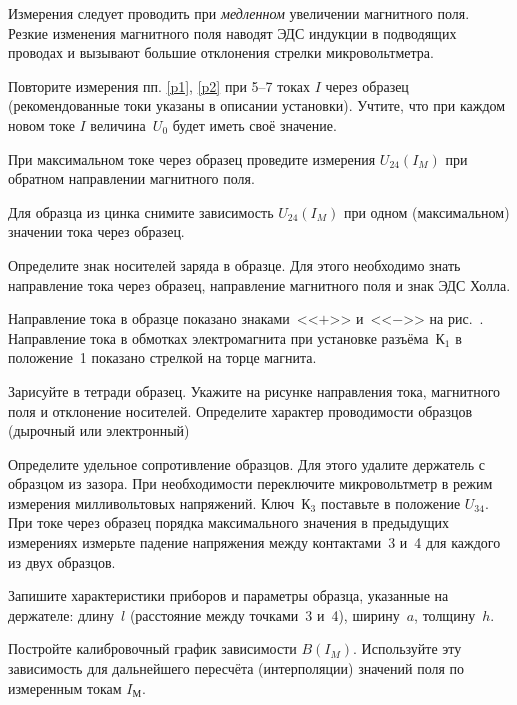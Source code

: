 \begin{lab:task}
Измерения следует проводить при \emph{медленном} увеличении магнитного поля. 
Резкие изменения магнитного поля наводят ЭДС индукции в подводящих проводах 
и вызывают большие отклонения стрелки микровольтметра.

\item Повторите измерения пп. \ref{p1}, \ref{p2} при 5--7 токах $I$ через образец
(рекомендованные токи указаны в описании установки).  
Учтите, что при каждом новом токе $I$ величина~$U_0$ будет иметь 
своё значение.

\item При максимальном токе через образец проведите измерения $U_{24}(I_{M})$ 
при обратном направлении магнитного поля.

\item Для образца из цинка снимите зависимость $U_{24}(I_{M})$ при одном 
(максимальном) значении тока через образец.

\item Определите знак носителей заряда в образце. Для этого необходимо знать
направление тока через образец, направление магнитного поля и знак ЭДС Холла.

Направление тока в образце показано знаками~<<$+$>> и~<<$-$>> на
рис.~. Направление тока в обмотках электромагнита при 
установке разъёма~К$_1$ в положение~1 показано стрелкой на торце магнита.

Зарисуйте в тетради образец. Укажите на рисунке направления тока, магнитного
поля и отклонение носителей. Определите характер проводимости образцов
(дырочный или электронный)

\item Определите удельное сопротивление образцов. Для этого удалите держатель с
образцом из зазора. При необходимости переключите микровольтметр 
в режим измерения милливольтовых напряжений. Ключ~К$_3$ поставьте 
в положение $U_{34}$. При токе через образец порядка максимального 
значения в предыдущих измерениях измерьте падение напряжения между 
контактами~3 и~4 для каждого из двух образцов.

\item Запишите характеристики приборов и параметры образца, указанные на держателе:
длину~$l$ (расстояние между точками~3 и~4), ширину~$a$, толщину~$h$.


\item Постройте калибровочный график зависимости $B(I_{M})$. 
Используйте эту зависимость для дальнейшего пересчёта (интерполяции)
значений поля по измеренным токам $I_{М}$.


\end{lab:task}
